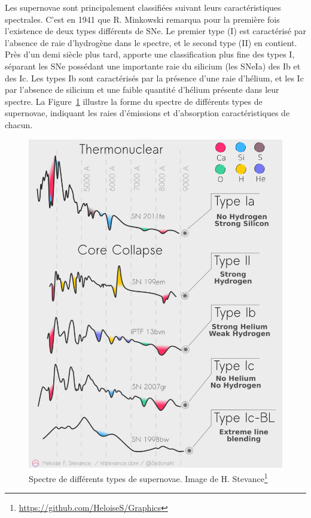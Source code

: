 \documentclass[../main/main.tex]{subfiles}
\begin{document}
Les supernovae sont principalement classifiées suivant leurs
caractéristiques spectrales. C'est en 1941 que R. Minkowski
\citep{Minkowski1941} remarqua pour la première fois l'existence de deux
types différents de SNe. Le premier type (I) est caractérisé par
l'absence de raie d'hydrogène dans le spectre, et le second type (II) en contient.
Près d'un demi siècle plus tard, \citet{Elias1985} apporte une
classification plus fine des types I, séparant les SNe possédant une importante
raie du silicium (les SNeIa) des Ib et des Ic. Les
types Ib sont caractérisés par la présence d'une raie d'hélium, et les
Ic par l'absence de silicium et une faible quantité d'hélium présente
dans leur spectre. La Figure~\ref{fig:snetypes} illustre la forme du
spectre de différents types de supernovae, indiquant les raies
d'émissions et d'absorption caractéristiques de chacun.

\begin{figure}[ht]
  \begin{minipage}[c]{0.59\textwidth}
    \includegraphics[width=\textwidth]{../figures/01bis_sne/snetype.pdf}
  \end{minipage}\hfill
  \begin{minipage}[c]{0.4\textwidth}
    \caption[Spectre de différents types de supernovae.]{Spectre de
      différents types de supernovae. Image de H. Stevance\footnote{\url{https://github.com/HeloiseS/Graphics}}}\label{fig:snetypes}
  \end{minipage}
\end{figure}
\end{document}

